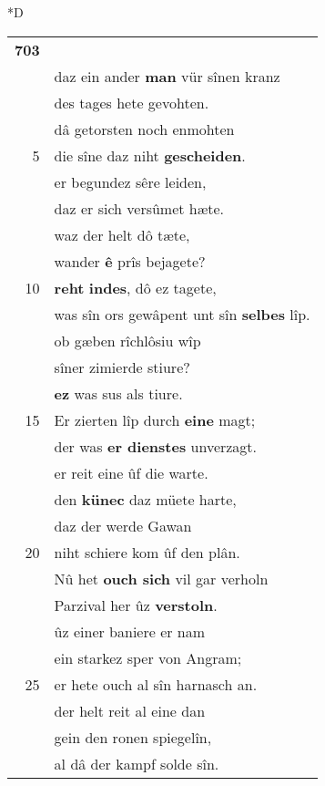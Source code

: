 \documentclass[8pt,a4paper,notitlepage]{article}
\begin{document}
\begin{table}[ht]
\begin{minipage}[t]{0.5\linewidth}
\small
\begin{center}*D
\end{center}
\begin{tabular}{rl}
\textbf{703} & \textbf{\textit{\begin{large}O\end{large}}uch} rou den künec Gramoflanz,\\ 
 & daz ein ander \textbf{man} vür sînen kranz\\ 
 & des tages hete gevohten.\\ 
 & dâ getorsten noch enmohten\\ 
5 & die sîne daz niht \textbf{gescheiden}.\\ 
 & er begundez sêre leiden,\\ 
 & daz er sich versûmet hæte.\\ 
 & waz der helt dô tæte,\\ 
 & wander \textbf{ê} prîs bejagete?\\ 
10 & \textbf{reht} \textbf{indes}, dô ez tagete,\\ 
 & was sîn ors gewâpent unt sîn \textbf{selbes} lîp.\\ 
 & ob gæben rîchlôsiu wîp\\ 
 & sîner zimierde stiure?\\ 
 & \textbf{ez} was sus als tiure.\\ 
15 & Er zierten lîp durch \textbf{eine} magt;\\ 
 & der was \textbf{er dienstes} unverzagt.\\ 
 & er reit eine ûf die warte.\\ 
 & den \textbf{künec} daz müete harte,\\ 
 & daz der werde Gawan\\ 
20 & niht schiere kom ûf den plân.\\ 
 & Nû het \textbf{ouch sich} vil gar verholn\\ 
 & Parzival her ûz \textbf{verstoln}.\\ 
 & ûz einer baniere er nam\\ 
 & ein starkez sper von Angram;\\ 
25 & er hete ouch al sîn harnasch an.\\ 
 & der helt reit al eine dan\\ 
 & gein den ronen spiegelîn,\\ 
 & al dâ der kampf solde sîn.\\ 

\end{tabular}
\end{minipage}
\end{table}
\end{document}
